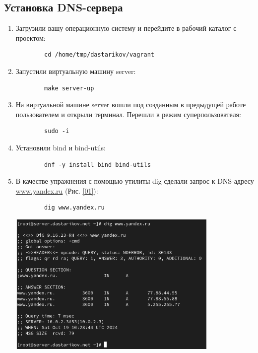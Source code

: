 \subsection{Установка DNS-сервера}
\begin{enumerate}
    \item Загрузили вашу операционную систему и перейдите в рабочий каталог с проектом:
        \begin{verbatim}
        cd /home/tmp/dastarikov/vagrant
        \end{verbatim}
    \item Запустили виртуальную машину server:
        \begin{verbatim}
        make server-up
        \end{verbatim}
    \item На виртуальной машине server вошли под созданным  в предыдущей работе пользователем и открыли терминал. Перешли в режим суперпользователя:
        \begin{verbatim}
        sudo -i
        \end{verbatim}
    \item Установили bind и bind-utils:
        \begin{verbatim}
        dnf -y install bind bind-utils
        \end{verbatim}

    \item В качестве упражнения с помощью утилиты dig сделали запрос к DNS-адресу \url{www.yandex.ru} (Рис. \ref{01}):
        \begin{verbatim}
        dig www.yandex.ru
        \end{verbatim}

\begin{center}
    \centering
    \includegraphics[width=0.8\textwidth]{../images/image01.png}
    \label{01}
\end{center}

\end{enumerate}

